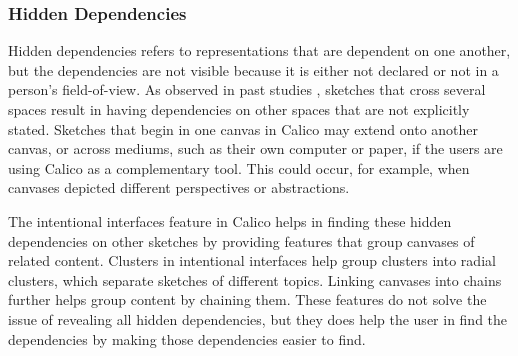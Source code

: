 \documentclass[12pt,fleqn]{ucithesis}
\begin{document}

%

\subsubsection{Hidden Dependencies}
Hidden dependencies refers to representations that are dependent on one another, but the dependencies are not visible because it is either not declared or not in a person's field-of-view. As observed in past studies \cite{dekel2007notation}, sketches that cross several spaces result in having dependencies on other spaces that are not explicitly stated. Sketches that begin in one canvas in Calico may extend onto another canvas, or across mediums, such as their own computer or paper, if the users are using Calico as a complementary tool. This could occur, for example, when canvases depicted different perspectives or abstractions. 

The intentional interfaces feature in Calico helps in finding these hidden dependencies on other sketches by providing features that group canvases of related content. Clusters in intentional interfaces help group clusters into radial clusters, which separate sketches of different topics. Linking canvases into chains further helps group content by chaining them. These features do not solve the issue of revealing all hidden dependencies, but they does help the user in find the dependencies by making those dependencies easier to find.
\end{document}
